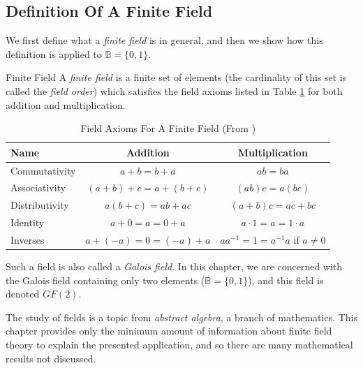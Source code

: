 \subsection{Definition Of A Finite Field}
\label{cedc0:sfft0:dff0}

We first define what a  \emph{finite field} is in general, and 
then we show how this definition is applied to $\mathbb{B} = \{ 0, 1 \}$.

\begin{vworkdefinitionstatementpar}{Finite Field}
A \emph{finite field} \cite{bibref:w:weissteinmathworld}
is a finite set of elements (the cardinality of this
set is called the \emph{field order}) which 
satisfies the field axioms
listed in Table \ref{tbl:cedc0:sfft0:dff0:01} for both addition and
multiplication.

\begin{table}
\caption{Field Axioms For A Finite Field (From \cite{bibref:w:weissteinmathworld})}
\label{tbl:cedc0:sfft0:dff0:01}
\begin{center}
\begin{tabular}{|l|c|c|}
\hline
Name           &  Addition             & Multiplication       \\
\hline
\hline
Commutativity  & $a+b = b+a$           & $ab = ba$             \\
\hline
Associativity  & $(a+b)+c=a+(b+c)$     & $(ab)c=a(bc)$         \\
\hline
Distributivity & $a(b+c)=ab+ac$        & $(a+b)c=ac+bc$        \\
\hline
Identity       & $a+0=a=0+a$           & $a \cdot 1=a=1 \cdot a$ \\
\hline
Inverses       & $a+(-a)=0=(-a)+a$     & $aa^{-1}=1=a^{-1}a$ if $a \neq 0$ \\
\hline
\end{tabular}
\end{center}
\end{table}

Such a field is also called a \emph{Galois field}.
In this chapter, we are concerned with the Galois field containing
only two elements ($\mathbb{B}=\{ 0,1 \}$), and this field is denoted $GF(2)$.
\end{vworkdefinitionstatementpar}
\vworkdefinitionfooter{}

The study of fields is a topic from \emph{abstract algebra},
a branch of mathematics.  This chapter provides only the
minimum amount of information about finite field theory to explain
the presented application, and so there are many mathematical results 
not discussed.

